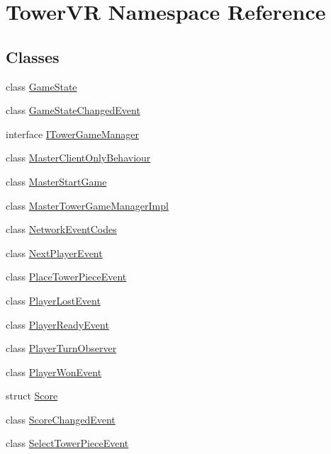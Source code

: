 \hypertarget{namespace_tower_v_r}{}\section{Tower\+VR Namespace Reference}
\label{namespace_tower_v_r}
\subsection*{Classes}
\begin{DoxyCompactItemize}
\item 
class \hyperlink{class_tower_v_r_1_1_game_state}{Game\+State}
\item 
class \hyperlink{class_tower_v_r_1_1_game_state_changed_event}{Game\+State\+Changed\+Event}
\item 
interface \hyperlink{interface_tower_v_r_1_1_i_tower_game_manager}{I\+Tower\+Game\+Manager}
\item 
class \hyperlink{class_tower_v_r_1_1_master_client_only_behaviour}{Master\+Client\+Only\+Behaviour}
\item 
class \hyperlink{class_tower_v_r_1_1_master_start_game}{Master\+Start\+Game}
\item 
class \hyperlink{class_tower_v_r_1_1_master_tower_game_manager_impl}{Master\+Tower\+Game\+Manager\+Impl}
\item 
class \hyperlink{class_tower_v_r_1_1_network_event_codes}{Network\+Event\+Codes}
\item 
class \hyperlink{class_tower_v_r_1_1_next_player_event}{Next\+Player\+Event}
\item 
class \hyperlink{class_tower_v_r_1_1_place_tower_piece_event}{Place\+Tower\+Piece\+Event}
\item 
class \hyperlink{class_tower_v_r_1_1_player_lost_event}{Player\+Lost\+Event}
\item 
class \hyperlink{class_tower_v_r_1_1_player_ready_event}{Player\+Ready\+Event}
\item 
class \hyperlink{class_tower_v_r_1_1_player_turn_observer}{Player\+Turn\+Observer}
\item 
class \hyperlink{class_tower_v_r_1_1_player_won_event}{Player\+Won\+Event}
\item 
struct \hyperlink{struct_tower_v_r_1_1_score}{Score}
\item 
class \hyperlink{class_tower_v_r_1_1_score_changed_event}{Score\+Changed\+Event}
\item 
class \hyperlink{class_tower_v_r_1_1_select_tower_piece_event}{Select\+Tower\+Piece\+Event}

\end{DoxyCompactItemize}
